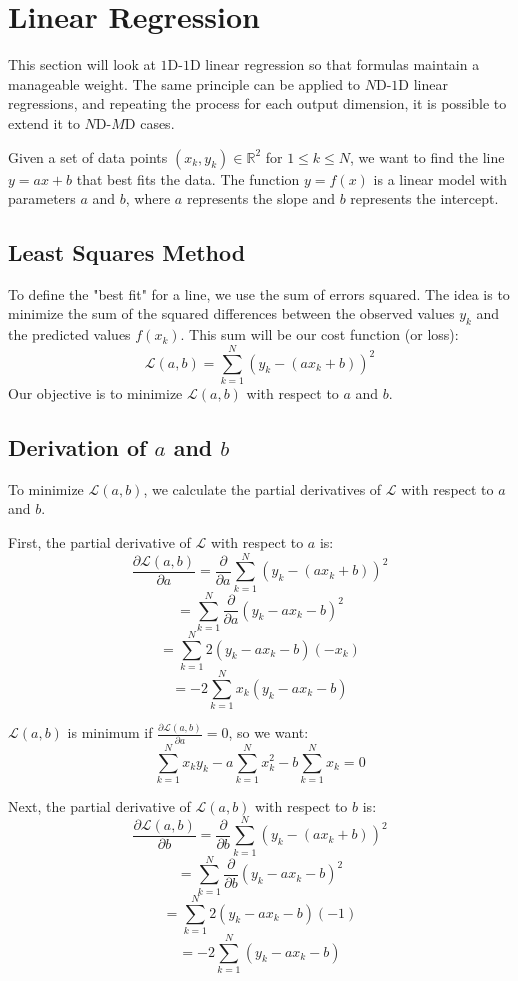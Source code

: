\documentclass[]{article}
\begin{document}
	\section*{Linear Regression}
	This section will look at $1$D-$1$D linear regression so that formulas maintain a manageable weight.
	The same principle can be applied to $N$D-$1$D linear regressions, and repeating the process for each output dimension, it is possible to extend it to $N$D-$M$D cases.
	
	Given a set of data points $(x_k, y_k) \in \mathbb{R}^2$ for $1 \leq k \leq N$, we want to find the line $y = ax + b$ that best fits the data.
	The function $y = f(x)$ is a linear model with parameters $a$ and $b$, where $a$ represents the slope and $b$ represents the intercept.
	
	\subsection*{Least Squares Method}
	To define the "best fit" for a line, we use the sum of errors squared.
	The idea is to minimize the sum of the squared differences between the observed values $y_k$ and the predicted values $f(x_k)$.
	This sum will be our cost function (or loss):
	$$
	\mathcal{L}(a, b) = \sum_{k=1}^{N} \left( y_k - (ax_k + b) \right)^2
	$$
	Our objective is to minimize $\mathcal{L}(a, b)$ with respect to $a$ and $b$.
	
	\subsection*{Derivation of $a$ and $b$}
	To minimize $\mathcal{L}(a, b)$, we calculate the partial derivatives of $\mathcal{L}$ with respect to $a$ and $b$.
	
	First, the partial derivative of $\mathcal{L}$ with respect to $a$ is:
	$$
	\frac{\partial \mathcal{L}(a, b)}{\partial a} = \frac{\partial}{\partial a} \sum_{k=1}^{N} \left( y_k - (ax_k + b) \right)^2
	$$
	$$
	= \sum_{k=1}^{N} \frac{\partial}{\partial a} \left( y_k - ax_k - b \right)^2
	$$
	$$
	= \sum_{k=1}^{N} 2 \left( y_k - ax_k - b \right) (-x_k)
	$$
	$$
	= -2 \sum_{k=1}^{N} x_k \left( y_k - ax_k - b \right)
	$$
	
	$\mathcal{L}(a, b)$ is minimum if $\frac{\partial \mathcal{L}(a, b)}{\partial a} = 0$, so we want:
	$$
	\sum_{k=1}^{N} x_k y_k - a \sum_{k=1}^{N} x_k^2 - b \sum_{k=1}^{N} x_k = 0
	$$
	
	Next, the partial derivative of $\mathcal{L}(a, b)$ with respect to $b$ is:
	$$
	\frac{\partial \mathcal{L}(a, b)}{\partial b} = \frac{\partial}{\partial b} \sum_{k=1}^{N} \left( y_k - (ax_k + b) \right)^2
	$$
	$$
	= \sum_{k=1}^{N} \frac{\partial}{\partial b} \left( y_k - ax_k - b \right)^2
	$$
	$$
	= \sum_{k=1}^{N} 2 \left( y_k - ax_k - b \right) (-1)
	$$
	$$
	= -2 \sum_{k=1}^{N} \left( y_k - ax_k - b \right)
	$$
	
\end{document}
